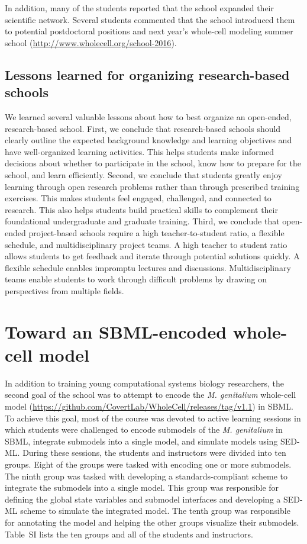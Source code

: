\documentclass[journal,transmag]{IEEEtran}
\begin{document}
In addition, many of the students reported that the school expanded their scientific network. Several students commented that the school introduced them to potential postdoctoral positions and next year's whole-cell modeling summer school (\href{http://www.wholecell.org/school-2016}{http://www.wholecell.org/school-2016}).

\subsection{Lessons learned for organizing research-based schools}
We learned several valuable lessons about how to best organize an open-ended, research-based school. First, we conclude that research-based schools should clearly outline the expected background knowledge and learning objectives and have well-organized learning activities. This helps students make informed decisions about whether to participate in the school, know how to prepare for the school, and learn efficiently.
Second, we conclude that students greatly enjoy learning through open research problems rather than through prescribed training exercises. This makes students feel engaged, challenged, and connected to research. This also helps students build practical skills to complement their foundational undergraduate and graduate training.
Third, we conclude that open-ended project-based schools require a high teacher-to-student ratio, a flexible schedule, and multidisciplinary project teams. A high teacher to student ratio allows students to get feedback and iterate through potential solutions quickly. A flexible schedule enables impromptu lectures and discussions. Multidisciplinary teams enable students to work through difficult problems by drawing on perspectives from multiple fields. 

\section{Toward an SBML-encoded whole-cell model}
In addition to training young computational systems biology researchers, the second goal of the school was to attempt to encode the \textit{M. genitalium} whole-cell model (\url{https://github.com/CovertLab/WholeCell/releases/tag/v1.1}) in SBML. To achieve this goal, most of the course was devoted to active learning sessions in which students were challenged to encode submodels of the \textit{M. genitalium} in SBML, integrate submodels into a single model, and simulate models using SED-ML. During these sessions, the students and instructors were divided into ten groups. Eight of the groups were tasked with encoding one or more submodels. The ninth group was tasked with developing a standards-compliant scheme to integrate the submodels into a single model. This group was responsible for defining the global state variables and submodel interfaces and developing a SED-ML scheme to simulate the integrated model. The tenth group was responsible for annotating the model and helping the other groups visualize their submodels. Table~SI lists the ten groups and all of the students and instructors. 
\end{document}
